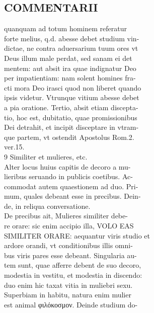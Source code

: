 \documentclass{article}
\begin{document}
\begin{pages}
\section*{COMMENTARII \\
                }
quanquam ad totum hominem referatur \\
                forte melius, q.d. abesse debet studium vin- \\
                dictae, ne contra aduersarium tuum ores vt \\
                Deus illum male perdat, sed sanam ei det \\
                mentem: aut absit ira quae indignatur Deo \\
                per impatientiam: nam solent homines fra- \\
                cti mora Deo irasci quod non liberet quando \\
                ipsis videtur. Vtrunque vitium abesse debet \\
                a pia oratione. Tertio, absit etiam discepta- \\
                tio, hoc est, dubitatio, quae promissionibus \\
                Dei detrahit, et incipit disceptare in vtram- \\
                que partem, vt ostendit Apostolus Rom.2. \\
                ver.15. \\
                9 Similiter et mulieres, etc. \\
                Alter locus huius capitis de decoro a mu- \\
                lieribus seruando in publicis coetibus. Ac- \\
                commodat autem quaestionem ad duo. Pri- \\
                mum, quales debeant esse in precibus. Dein- \\
                de, in reliqua conversatione. \\
                De precibus ait, Mulieres similiter debe- \\
                re orare: sic enim accipio illa, VOLO EAS \\
                SIMILITER ORARE: aequantur viris studio et \\
                ardore orandi, vt conditionibus illis omni- \\
                bus viris pares esse debeant. Singularia au- \\
                tem sunt, quae afferre debent de suo decoro, \\
                modestia in vestitu, et modestia in discendo: \\
                duo enim hic taxat vitia in muliebri sexu. \\
                Superbiam in habitu, natura enim mulier \\
                est animal φιλόκοσμον. Deinde studium do- \\
                

\end{pages}
\end{document}
